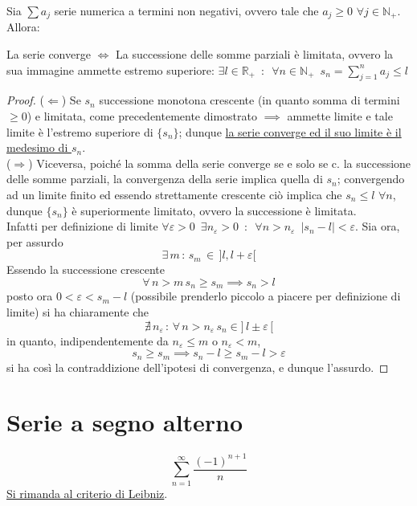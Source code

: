 \documentclass[10pt, oneside]{book}
\theoremstyle{plain}
\begin{document}
\begin{ther}
Sia $\sum a_j$ serie numerica a termini non negativi, ovvero tale che $a_j \geq 0$ $\forall j \in \mathbb{N}_+$. Allora:
\begin{center}
    La serie converge $\Longleftrightarrow$ La successione delle somme parziali è limitata, ovvero la sua immagine ammette estremo superiore: $\exists l \in \mathbb{R}_+ \enspace : \enspace \forall n \in \mathbb{N}_+ \enspace s_n = \sum_{j=1}^{n} a_j \leq l$
\end{center}
\end{ther}
\begin{proof}
($\Leftarrow$) Se $s_n$ successione monotona crescente (in quanto somma di termini $\geq 0$) e limitata, come precedentemente dimostrato $\implies$ ammette limite e tale limite è l'estremo superiore di $\{s_n\}$; dunque \hyperlink{sommeparziali}{la serie converge ed il suo limite è il medesimo di $s_n$}.  
\\($\Rightarrow$) Viceversa, poiché la somma della serie converge se e solo se c. la successione delle somme parziali, la convergenza della serie implica quella di $s_n$; convergendo ad un limite finito ed essendo strettamente crescente ciò implica che $s_n \leq l$ $\forall n$, dunque $\{s_n\}$ è superiormente limitato, ovvero la successione è limitata.\\
Infatti per definizione di limite $\forall \varepsilon > 0 \enspace \exists n_\varepsilon > 0 \enspace : \enspace \forall n > n_\varepsilon \enspace |s_n - l| < \varepsilon$. Sia ora, per assurdo
\[\exists \, m \, : \, s_m \, \in \, ]l, l+\varepsilon[\]
Essendo la successione crescente
\[\forall \, n > m \, s_n \geq s_m \implies s_n > l\]
posto ora $0 < \varepsilon < s_m - l$ (possibile prenderlo piccolo a piacere per definizione di limite) si ha chiaramente che
\[\nexists \, n_\varepsilon \, : \, \forall \, n > n_\varepsilon \, s_n \in ] \, l \pm \varepsilon \, [\]
in quanto, indipendentemente da $n_\varepsilon \leq m$ o $n_\varepsilon < m$,
\[s_n \geq s_m \implies s_n - l \geq s_m - l > \varepsilon\]
si ha così la contraddizione dell'ipotesi di convergenza, e dunque l'assurdo.
\end{proof}

\section{Serie a segno alterno}
\[\sum \limits_{n = 1}^{\infty} \frac{(-1)^{n+1}}{n}\]
\hyperlink{leibniz}{Si rimanda al criterio di Leibniz}.
\end{document}
